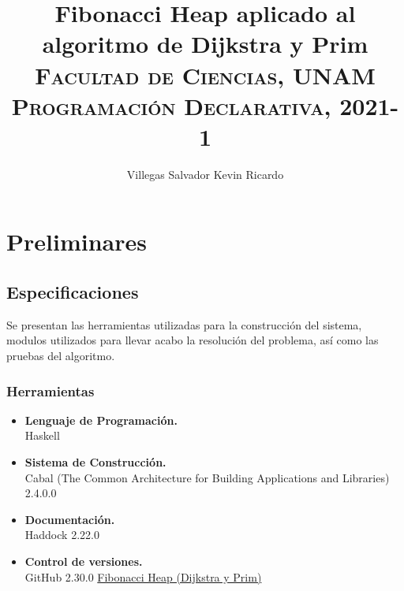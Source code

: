 \documentclass[a4paper, titlepage, 12pt]{article}
\title{\textbf{Fibonacci Heap aplicado al algoritmo de Dijkstra y Prim}\\
  \vspace{2.5cm}
  \textsc{Facultad de Ciencias, UNAM}\\
  \normalsize\textsc{Programación Declarativa, 2021-1}
}
\author{ Villegas Salvador Kevin Ricardo }
\theoremstyle{definition}%
\theoremstyle{Teorema}
\theoremstyle{break}
\begin{document}
\maketitle

\section{Preliminares}
\subsection{Especificaciones}
Se presentan las herramientas utilizadas para la construcción del sistema,
modulos utilizados para llevar acabo la resolución del problema, así como las pruebas del 
algoritmo.
\subsubsection{Herramientas}
\begin{itemize}
  \item \textbf{Lenguaje de Programación.}\\
  Haskell
  \item \textbf{Sistema de Construcción.}\\
  Cabal (The Common Architecture for Building Applications and Libraries) 2.4.0.0
  \item \textbf{Documentación.}\\
  Haddock 2.22.0
  \item \textbf{Control de versiones.}\\
  GitHub 2.30.0 \href{https://github.com/ciencias-unam/proyecto-final-kevRicardo}{Fibonacci Heap (Dijkstra y Prim)}
\end{itemize}
\end{document}
